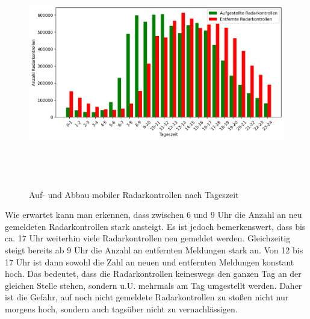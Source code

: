 \begin{figure}[h]
    \centering
    \includegraphics[width=1.0\textwidth,height=10cm,keepaspectratio=true]{content/images/AufbauAbbau.png}
    \caption{Auf- und Abbau mobiler Radarkontrollen nach Tageszeit}
    \label{fig:AufbauAbbauNachTageszeit}
\end{figure}

Wie erwartet kann man erkennen, dass zwischen 6 und 9 Uhr die Anzahl an neu gemeldeten Radarkontrollen stark ansteigt.
Es ist jedoch bemerkenswert, dass bis ca. 17 Uhr weiterhin viele Radarkontrollen neu gemeldet werden.
Gleichzeitig steigt bereits ab 9 Uhr die Anzahl an entfernten Meldungen stark an.
Von 12 bis 17 Uhr ist dann sowohl die Zahl an neuen und entfernten Meldungen konstant hoch.
Das bedeutet, dass die Radarkontrollen keineswegs den ganzen Tag an der gleichen Stelle stehen, sondern u.U. mehrmals am Tag umgestellt werden.
Daher ist die Gefahr, auf noch nicht gemeldete Radarkontrollen zu stoßen nicht nur morgens hoch, sondern auch tagsüber nicht zu vernachlässigen.
